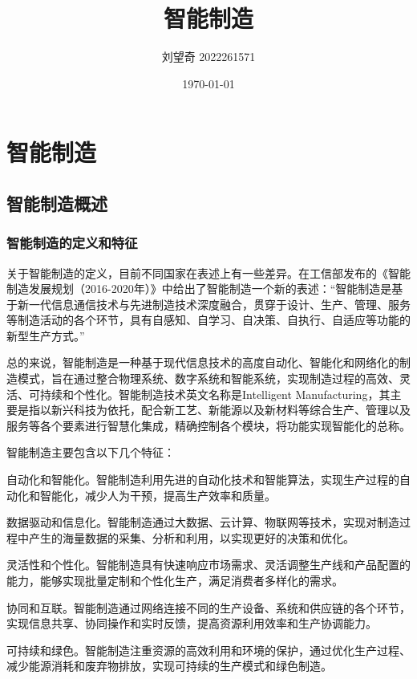 \documentclass[lang=cn,12pt,bibtex,newtx,twoside,margintrue,citestyle=gb7714-2015, bibstyle=gb7714-2015]{elegantbook}
\author{刘望奇 2022261571}
\date{\today}
\title{智能制造}
\begin{document}
\maketitle
\tableofcontents

\mainmatter

\chapter{智能制造}
\label{sec:org0099496}
\section{智能制造概述}
\label{sec:org855a6fd}
\subsection{智能制造的定义和特征}
\label{sec:org9982659}

关于智能制造的定义，目前不同国家在表述上有一些差异。在工信部发布的《智能制造发展规划（2016-2020年）》中给出了智能制造一个新的表述：“智能制造是基于新一代信息通信技术与先进制造技术深度融合，贯穿于设计、生产、管理、服务等制造活动的各个环节，具有自感知、自学习、自决策、自执行、自适应等功能的新型生产方式。”\cite{01}

总的来说，智能制造是一种基于现代信息技术的高度自动化、智能化和网络化的制造模式，旨在通过整合物理系统、数字系统和智能系统，实现制造过程的高效、灵活、可持续和个性化。智能制造技术英文名称是Intelligent Manufacturing，其主要是指以新兴科技为依托，配合新工艺、新能源以及新材料等综合生产、管理以及服务等各个要素进行智慧化集成，精确控制各个模块，将功能实现智能化的总称\cite{02}。

智能制造主要包含以下几个特征：

自动化和智能化。智能制造利用先进的自动化技术和智能算法，实现生产过程的自动化和智能化，减少人为干预，提高生产效率和质量。

数据驱动和信息化。智能制造通过大数据、云计算、物联网等技术，实现对制造过程中产生的海量数据的采集、分析和利用，以实现更好的决策和优化。

灵活性和个性化。智能制造具有快速响应市场需求、灵活调整生产线和产品配置的能力，能够实现批量定制和个性化生产，满足消费者多样化的需求。

协同和互联。智能制造通过网络连接不同的生产设备、系统和供应链的各个环节，实现信息共享、协同操作和实时反馈，提高资源利用效率和生产协调能力。

可持续和绿色。智能制造注重资源的高效利用和环境的保护，通过优化生产过程、减少能源消耗和废弃物排放，实现可持续的生产模式和绿色制造。
\end{document}
